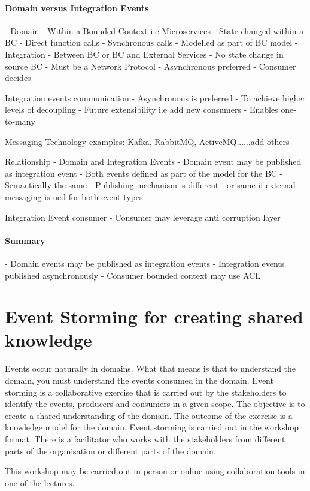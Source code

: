 \subsubsection{Domain versus Integration Events}
- Domain
- Within a Bounded Context i.e Microservices
- State changed within a BC
- Direct function calls
- Synchronous calls
- Modelled as part of BC model
- Integration
- Between BC or BC and External Services
- No state change in source BC
- Must be a Network Protocol
- Asynchronous preferred
- Consumer decides

Integration events communication
- Asynchronous is preferred
- To achieve higher levels of decoupling
- Future extensibility i.e add new consumers
- Enables one-to-many

Messaging Technology examples: Kafka, RabbitMQ, ActiveMQ......add others

Relationship - Domain and Integration Events
- Domain event may be published as integration event
- Both events defined as part of the model for the BC
- Semantically the same
- Publishing mechanism is different - or same if external messaging is ued for both event types

Integration Event consumer
- Consumer may leverage anti corruption layer

\subsubsection{Summary}
- Domain events may be published as integration events
- Integration events published asynchronously
- Consumer bounded context may use ACL

\chapter{Event Storming for creating shared knowledge}

Events occur naturally in domains.
What that means is that to understand the domain, you must understand the events consumed in the domain.
Event storming is a collaborative exercise that is carried out by the stakeholders to identify the events, producers and consumers in a given scope.
The objective is to create a shared understanding of the domain.
The outcome of the exercise is a knowledge model for the domain.
Event storming is carried out in the workshop format.
There is a facilitator who works with the stakeholders from different parts of the organisation or different parts of the domain.

This workshop may be carried out in person or online using collaboration tools in one of the lectures.

